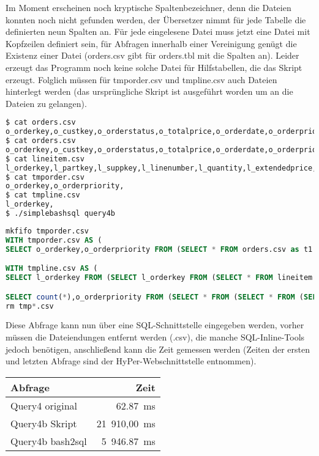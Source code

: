 Im Moment erscheinen noch kryptische Spaltenbezeichner, denn die Dateien konnten noch nicht gefunden werden, der Übersetzer nimmt für jede Tabelle die definierten neun Spalten an. Für jede eingelesene Datei muss jetzt eine Datei mit Kopfzeilen definiert sein, für Abfragen innerhalb einer Vereinigung genügt die Existenz einer Datei (orders.csv gibt für orders.tbl mit die Spalten an). Leider erzeugt das Programm noch keine solche Datei für Hilfstabellen, die das Skript erzeugt. Folglich müssen für tmporder.csv und tmpline.csv auch Dateien hinterlegt werden (das ursprüngliche Skript ist ausgeführt worden um an die Dateien zu gelangen).
\begin{lstlisting}[language=Bash]
$ cat orders.csv 
o_orderkey,o_custkey,o_orderstatus,o_totalprice,o_orderdate,o_orderpriority,o_clerk,o_shippriority,o_comment,
$ cat orders.csv 
o_orderkey,o_custkey,o_orderstatus,o_totalprice,o_orderdate,o_orderpriority,o_clerk,o_shippriority,o_comment,
$ cat lineitem.csv 
l_orderkey,l_partkey,l_suppkey,l_linenumber,l_quantity,l_extendedprice,l_discount,l_tax,l_returnflag,l_linestatus,l_shipdate,l_commitdate,l_receiptdate,l_shipinstruct,l_shipmode,l_comment,
$ cat tmporder.csv 
o_orderkey,o_orderpriority,
$ cat tmpline.csv 
l_orderkey,
$ ./simplebashsql query4b
\end{lstlisting}\begin{lstlisting}[language=SQL]
mkfifo tmporder.csv
WITH tmporder.csv AS (
SELECT o_orderkey,o_orderpriority FROM (SELECT * FROM orders.csv as t1  UNION SELECT * FROM (SELECT * FROM orders.tbl as t1  ORDER BY $1,$1) as t1union1 ) as t1  WHERE (true) AND (o_orderdate<'1993-10-01') AND (o_orderdate>='1993-07-01')  )

WITH tmpline.csv AS (
SELECT l_orderkey FROM (SELECT l_orderkey FROM (SELECT * FROM lineitem.csv as t1  UNION SELECT * FROM (SELECT * FROM lineitem.tbl as t1  ORDER BY $1,$1) as t1union1 ) as t1  WHERE (true) AND (l_commitdate<l_receiptdate) ) as t1  GROUP BY l_orderkey )

SELECT count(*),o_orderpriority FROM (SELECT * FROM (SELECT * FROM (SELECT o_orderpriority FROM (SELECT o_orderkey,o_orderpriority FROM tmporder.csv as t1, tmpline.csv as t2  WHERE (t1.o_orderkey=t2.l_orderkey) ) as t1 ) as t1 ) as t1 ) as t1  GROUP BY o_orderpriority
rm tmp*.csv
\end{lstlisting}

Diese Abfrage kann nun über eine SQL-Schnittstelle eingegeben werden, vorher müssen die Dateiendungen entfernt werden (.csv), die manche SQL-Inline-Tools jedoch benötigen, anschließend kann die Zeit gemessen werden (Zeiten der ersten und letzten Abfrage sind der HyPer-Webschnittstelle entnommen).

\begin{center}
\begin{tabular}{|l|r|}
Abfrage & Zeit \\ \hline
Query4 original & 62.87\ ms\\
Query4b Skript &  21\ 910,00\ ms\\
Query4b bash2sql & 5\ 946.87\ ms
\end{tabular}
\end{center}
